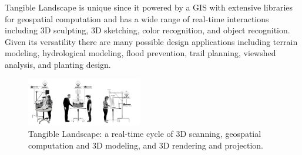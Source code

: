 \documentclass[Afour,sageh,times]{sagej}
\begin{document}
Tangible Landscape 
is unique since it powered by a GIS
with extensive libraries for geospatial computation
and has a wide range of real-time interactions including 
3D sculpting, 3D sketching, color recognition, and object recognition.
%
Given its versatility 
there are many possible design applications
including terrain modeling, hydrological modeling, flood prevention,
trail planning, viewshed analysis, and planting design. 

\begin{figure}
    \begin{center}
        \includegraphics[width=0.45\textwidth]{images/diagrams/rendered_diagram.png}
        \caption{Tangible Landscape: a real-time cycle of 3D scanning, geospatial computation and 3D modeling, and 3D rendering and projection.}
        \label{fig:system_diagram}
    \end{center}
\end{figure}
\end{document}
